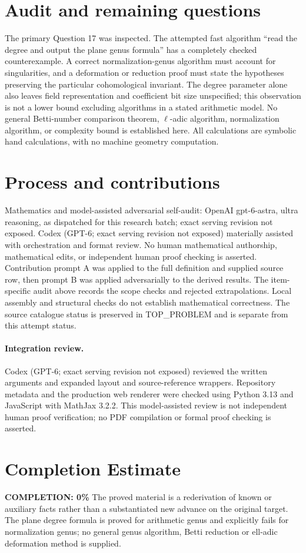 \documentclass[11pt]{article}
\begin{document}
\section{Audit and remaining questions}
The primary Question 17 was inspected. The attempted fast algorithm
``read the degree and output the plane genus formula'' has a completely
checked counterexample. A correct normalization-genus algorithm must
account for singularities, and a deformation or reduction proof must
state the hypotheses preserving the particular cohomological invariant.
The degree parameter alone also leaves field representation and
coefficient bit size unspecified; this observation is not a lower
bound excluding algorithms in a stated arithmetic model. No general
Betti-number comparison theorem, $\ell$-adic algorithm, normalization
algorithm, or complexity bound is established here. All calculations
are symbolic hand calculations, with no machine geometry computation.

\section{Process and contributions}
Mathematics and model-assisted adversarial self-audit: OpenAI gpt-6-astra, ultra reasoning, as dispatched for this research batch; exact serving revision not exposed. Codex (GPT-6; exact serving revision not exposed) materially assisted with orchestration and format review. No human mathematical authorship, mathematical edits, or independent human proof checking is asserted.
Contribution prompt A was applied to the full definition and supplied source row, then prompt B was applied adversarially to the derived results. The item-specific audit above records the scope checks and rejected extrapolations. Local assembly and structural checks do not establish mathematical correctness. The source catalogue status is preserved in TOP\_PROBLEM and is separate from this attempt status.
\paragraph{Integration review.} Codex (GPT-6; exact serving revision not exposed) reviewed the written arguments and expanded layout and source-reference wrappers. Repository metadata and the production web renderer were checked using Python 3.13 and JavaScript with MathJax 3.2.2. This model-assisted review is not independent human proof verification; no PDF compilation or formal proof checking is asserted.

\section{Completion Estimate}
\noindent\textbf{COMPLETION: 0\%}
The proved material is a rederivation of known or auxiliary facts rather than a substantiated new advance on the original target. The plane degree formula is proved for arithmetic genus and explicitly fails for normalization genus; no general genus algorithm, Betti reduction or ell-adic deformation method is supplied.
\end{document}
